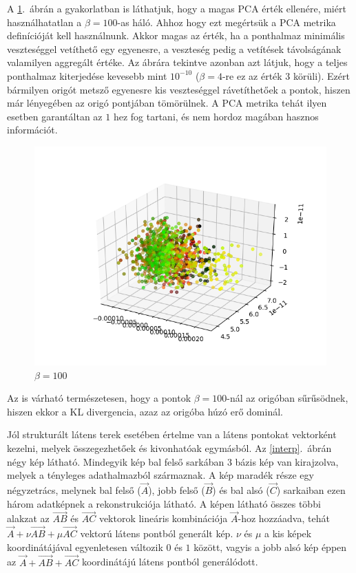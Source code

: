 A \ref{b100}.~ábrán a gyakorlatban is láthatjuk, hogy a magas PCA érték ellenére, miért használhatatlan a $\beta=100$-as háló.  Ahhoz hogy ezt megértsük a PCA metrika definícióját kell használnunk. Akkor magas az érték, ha a ponthalmaz minimális veszteséggel vetíthető egy egyenesre, a veszteség pedig a vetítések távolságának valamilyen aggregált értéke. Az ábrára tekintve azonban azt látjuk, hogy a teljes ponthalmaz kiterjedése kevesebb mint $10^{-10}$ ($\beta=4$-re ez az érték $3$ körüli). Ezért bármilyen origót metsző egyenesre kis veszteséggel rávetíthetőek a pontok, hiszen már lényegében az origó pontjában tömörülnek. A PCA metrika tehát ilyen esetben garantáltan az $1$ hez fog tartani, és nem hordoz magában hasznos információt.

\begin{figure}[h!]
\begin{center}
  
  \includegraphics[width=\linewidth]{3D-beta100.png}
  \caption{$\beta=100$}\label{b100}
\end{center}
\end{figure}


Az is várható természetesen, hogy a pontok $\beta=100$-nál az origóban sűrűsödnek, hiszen ekkor a KL divergencia, azaz az origóba húzó erő dominál.

Jól strukturált látens terek esetében értelme van a látens pontokat vektorként kezelni, melyek összegezhetőek és kivonhatóak egymásból. Az \ref{interp}.~ábrán négy kép látható. Mindegyik kép bal felső sarkában $3$ bázis kép van kirajzolva, melyek a tényleges adathalmazból származnak. A kép maradék része egy négyzetrács, melynek bal felső ($\vec{A}$), jobb felső ($\vec{B}$) és bal alsó ($\vec{C}$) sarkaiban ezen három adatképnek a rekonstrukciója látható. A képen látható összes többi alakzat az $\vec{AB}$ és $\vec{AC}$ vektorok lineáris kombinációja $\vec{A}$-hoz hozzáadva, tehát $\vec{A}+\nu\vec{AB}+\mu\vec{AC}$ vektorú látens pontból generált kép. $\nu$ és $\mu$ a kis képek koordinátájával egyenletesen változik $0$ és $1$ között, vagyis a jobb alsó kép éppen az $\vec{A}+\vec{AB}+\vec{AC}$ koordinátájú látens pontból generálódott. 

